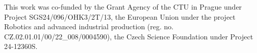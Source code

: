This work was co-funded by the Grant Agency of the CTU in Prague under Project SGS24/096/OHK3/2T/13, the European Union under the project Robotics and advanced industrial production (reg. no. CZ.02.01.01/00/22\_008/0004590), the Czech Science Foundation under Project 24-12360S.
